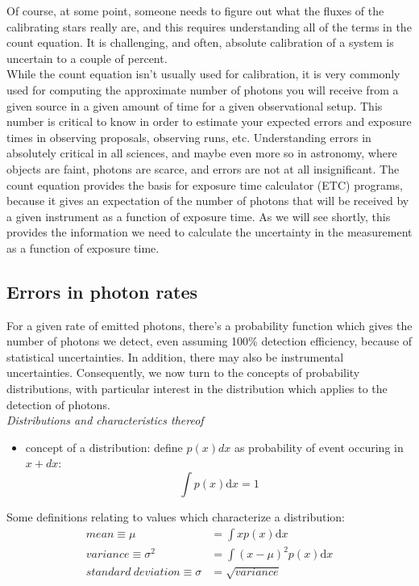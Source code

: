 \documentclass[12pt]{article}
\begin{document}
\noindent Of course, at some point, someone needs to figure out what
the fluxes of the calibrating stars really are, and this requires
understanding all of the terms in the count equation. It is
challenging, and often, absolute calibration of a system is uncertain
to a couple of percent.\\

\noindent While the count equation isn't usually used for calibration,
it is very commonly used for computing the approximate number of
photons you will receive from a given source in a given amount of time
for a given observational setup. This number is critical to know in
order to estimate your expected errors and exposure times in observing
proposals, observing runs, etc. Understanding errors in absolutely
critical in all sciences, and maybe even more so in astronomy, where
objects are faint, photons are scarce, and errors are not at all
insignificant. The count equation provides the basis for exposure time
calculator (ETC) programs, because it gives an expectation of the
number of photons that will be received by a given instrument as a
function of exposure time. As we will see shortly, this provides the
information we need to calculate the uncertainty in the measurement as
a function of exposure time.

\subsection*{Errors in photon rates}
For a given rate of emitted photons, there's a probability function
which gives the number of photons we detect, even assuming 100\%
detection efficiency, because of statistical uncertainties. In
addition, there may also be instrumental uncertainties. Consequently,
we now turn to the concepts of probability distributions, with
particular interest in the distribution which applies to the detection
of photons.\\

\noindent \emph{Distributions and characteristics thereof}
\begin{itemize}
    \item concept of a distribution: define $p(x)dx$ as probability of
    event occuring in $x + dx$:
    \begin{equation*}
        \int p(x)\textrm{d}x = 1
    \end{equation*}
\end{itemize}
Some definitions relating to values which characterize a distribution:
\begin{align*}
    mean \equiv \mu &= \int xp(x)\textrm{d}x \\
    variance \equiv \sigma^2 &= \int (x-\mu)^2 p(x)\textrm{d}x \\
    standard\ deviation \equiv \sigma &= \sqrt{variance}
\end{align*}
\end{document}
